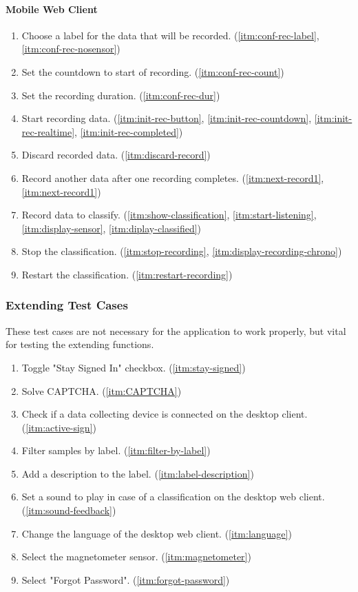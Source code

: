 \paragraph{Mobile Web Client}
\begin{enumerate}[resume*]
    \item Choose a \gls{label} for the data that will be recorded. (\ref{itm:conf-rec-label}, \ref{itm:conf-rec-nosensor})
    \item Set the countdown to start of recording. (\ref{itm:conf-rec-count})
    \item Set the recording duration. (\ref{itm:conf-rec-dur})
    \item Start recording data. (\ref{itm:init-rec-button}, \ref{itm:init-rec-countdown}, \ref{itm:init-rec-realtime}, \ref{itm:init-rec-completed})
    \item Discard recorded data. (\ref{itm:discard-record})
    \item Record another data after one recording completes. (\ref{itm:next-record1}, \ref{itm:next-record1})
    \item Record data to classify. (\ref{itm:show-classification}, \ref{itm:start-listening}, \ref{itm:display-sensor}, \ref{itm:diplay-classified})
    \item Stop the \gls{classification}. (\ref{itm:stop-recording}, \ref{itm:display-recording-chrono})
    \item Restart the \gls{classification}. (\ref{itm:restart-recording})
\end{enumerate}

\subsubsection{Extending Test Cases}
These test cases are not necessary for the application to work properly, but vital for testing the extending functions. 
\begin{enumerate}[resume*]
    \item Toggle "Stay Signed In" checkbox. (\ref{itm:stay-signed})
    \item Solve \gls{CAPTCHA}. (\ref{itm:CAPTCHA})
    \item Check if a data collecting device is connected on the desktop client. (\ref{itm:active-sign})
    \item Filter samples by label. (\ref{itm:filter-by-label})
    \item Add a description to the label. (\ref{itm:label-description})
    \item Set a sound to play in case of a \gls{classification} on the desktop web client. (\ref{itm:sound-feedback})
    \item Change the language of the desktop web client. (\ref{itm:language})
    \item Select the \gls{magnetometer} \gls{sensor}. (\ref{itm:magnetometer})
    \item Select "Forgot Password". (\ref{itm:forgot-password})
\end{enumerate}

